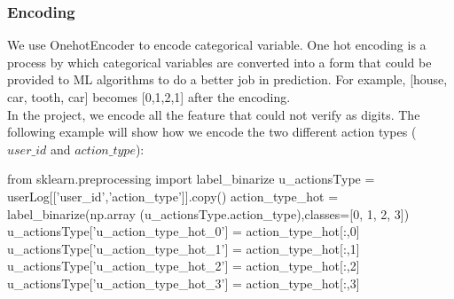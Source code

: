 \documentclass[sigconf]{acmart}
\begin{document}
\subsubsection{Encoding}
We use OnehotEncoder to encode categorical variable. One hot encoding is a process by which categorical variables are converted into a form that could be provided to ML algorithms to do a better job in prediction. For example, [house, car, tooth, car] becomes [0,1,2,1] after the encoding.\\
\indent
In the project, we encode all the feature that could not verify as digits. The following example will show how we encode the two different action types ($user\_id$ and $action\_type$):\\
\begin{python}
from sklearn.preprocessing import label_binarize
u_actionsType = userLog[['user_id','action_type']].copy()
action_type_hot = label_binarize(np.array
(u_actionsType.action_type),classes=[0, 1, 2, 3])
u_actionsType['u_action_type_hot_0'] = 
action_type_hot[:,0]
u_actionsType['u_action_type_hot_1'] = 
action_type_hot[:,1]
u_actionsType['u_action_type_hot_2'] = 
action_type_hot[:,2]
u_actionsType['u_action_type_hot_3'] = 
action_type_hot[:,3]
\end{python}
\end{document}
